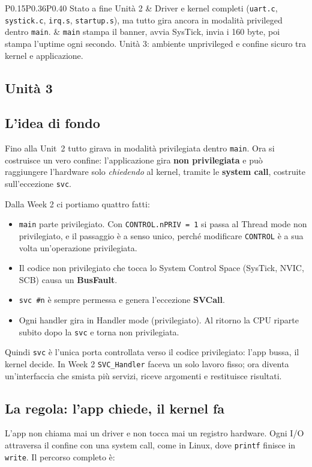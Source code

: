 {\begin{longtable}{P{0.15}P{0.36}P{0.40}}
        Stato a fine Unità 2
        & Driver e kernel completi (\texttt{uart.c}, \texttt{systick.c}, \texttt{irq.s}, \texttt{startup.s}), ma tutto gira ancora in modalità privileged dentro \texttt{main}.
        & \esem \texttt{main} stampa il banner, avvia SysTick, invia i 160 byte, poi stampa l'uptime ogni secondo.\nl
        \regl Unità 3: ambiente unprivileged e confine sicuro tra kernel e applicazione.\\
\end{longtable}
}

\subsection{Unità 3}
\subsection*{L'idea di fondo}
Fino alla Unit~2 tutto girava in modalità privilegiata dentro \texttt{main}. Ora si costruisce un vero confine: l'applicazione gira \textbf{non privilegiata} e può raggiungere l'hardware solo \textit{chiedendo} al kernel, tramite le \textbf{system call}, costruite sull'eccezione \texttt{svc}.
 
Dalla Week 2 ci portiamo quattro fatti:
\begin{itemize}
    \item \texttt{main} parte privilegiato. Con \texttt{CONTROL.nPRIV = 1} si passa al Thread mode non privilegiato, e il passaggio è a senso unico, perché modificare \texttt{CONTROL} è a sua volta un'operazione privilegiata.
    \item Il codice non privilegiato che tocca lo System Control Space (SysTick, NVIC, SCB) causa un \textbf{BusFault}.
    \item \texttt{svc \#n} è sempre permessa e genera l'eccezione \textbf{SVCall}.
    \item Ogni handler gira in Handler mode (privilegiato). Al ritorno la CPU riparte subito dopo la \texttt{svc} e torna non privilegiata.
\end{itemize}
 
Quindi \texttt{svc} è l'unica porta controllata verso il codice privilegiato: l'app bussa, il kernel decide. In Week 2 \texttt{SVC\_Handler} faceva un solo lavoro fisso; ora diventa un'interfaccia che smista più servizi, riceve argomenti e restituisce risultati.
 
\subsection*{La regola: l'app chiede, il kernel fa}
L'app non chiama mai un driver e non tocca mai un registro hardware. Ogni I/O attraversa il confine con una system call, come in Linux, dove \texttt{printf} finisce in \texttt{write}. Il percorso completo è:
 
